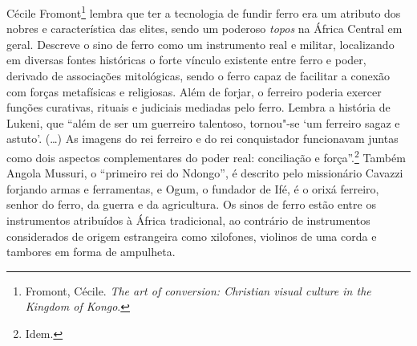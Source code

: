 Cécile Fromont\footnote{Fromont, Cécile. \emph{The art of conversion:
  Christian visual culture in the Kingdom of Kongo}.} lembra que ter a
tecnologia de fundir ferro era um atributo dos nobres e característica
das elites, sendo um poderoso \emph{topos} na África Central em geral.
Descreve o sino de ferro como um instrumento real e militar, localizando
em diversas fontes históricas o forte vínculo existente entre ferro e
poder, derivado de associações mitológicas, sendo o ferro capaz de
facilitar a conexão com forças metafísicas e religiosas. Além de forjar,
o ferreiro poderia exercer funções curativas, rituais e judiciais
mediadas pelo ferro. Lembra a história de Lukeni, que ``além de ser um
guerreiro talentoso, tornou"-se `um ferreiro sagaz e astuto'. (\ldots{}) As
imagens do rei ferreiro e do rei conquistador funcionavam juntas como
dois aspectos complementares do poder real: conciliação e
força''.\footnote{Idem.} Também Angola Mussuri, o ``primeiro rei do
Ndongo'', é descrito pelo missionário Cavazzi forjando armas e
ferramentas, e Ogum, o fundador de Ifé, é o orixá ferreiro, senhor do
ferro, da guerra e da agricultura. Os sinos de ferro estão entre os
instrumentos atribuídos à África tradicional, ao contrário de
instrumentos considerados de origem estrangeira como xilofones, violinos
de uma corda e tambores em forma de ampulheta.

